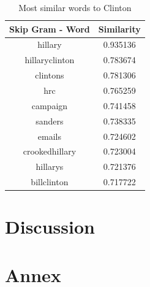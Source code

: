 \documentclass[12pt, authoryear]{elsarticle}
\begin{document}
\begin{center}
\begin{table}[H]
\begin{tabular}{ c c } 
Skip Gram - Word   &  Similarity \\
 \hline
hillary   &  0.935136\\
hillaryclinton   &  0.783674\\
clintons &    0.781306\\
hrc   &  0.765259\\
campaign  &   0.741458\\
sanders  &  0.738335\\
emails   &  0.724602\\
crookedhillary    & 0.723004\\
hillarys   &  0.721376\\
billclinton  &   0.717722\\
 \hline
\end{tabular}
\caption{Most similar words to Clinton}
\label{table:6}
\end{table}
\end{center}

\section{Discussion}
 
\pagebreak




\section{Annex}
\end{document}
